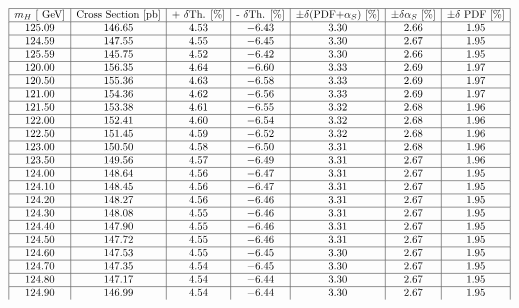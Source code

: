 \begin{table}[!h]
\begin{center}
\begin{equation}
\begin{array}{|c|c|c|c|c|c|c|}
 \hline
 m_H  \text{ [\ensuremath{~\text{GeV}}]}&\text{Cross Section [pb]}&\text{+ $\delta$Th. [\%]}&\text{- $\delta$Th. [\%]}&\pm\delta\text{(PDF+$\alpha_S$) [\%]}& \pm\delta\text{$\alpha_S$ [\%]} & \pm\delta\text{ PDF [\%]}  \\
\hline 
125.09 & 146.65 & 4.53 & -6.43 & 3.30 & 2.66 & 1.95\\
\hline 
124.59 & 147.55 & 4.55 & -6.45 & 3.30 & 2.67 & 1.95\\
\hline 
125.59 & 145.75 & 4.52 & -6.42 & 3.30 & 2.66 & 1.95\\
\hline 
120.00 & 156.35 & 4.64 & -6.60 & 3.33 & 2.69 & 1.97\\
\hline 
120.50 & 155.36 & 4.63 & -6.58 & 3.33 & 2.69 & 1.97\\
\hline 
121.00 & 154.36 & 4.62 & -6.56 & 3.33 & 2.69 & 1.97\\
\hline 
121.50 & 153.38 & 4.61 & -6.55 & 3.32 & 2.68 & 1.96\\
\hline 
122.00 & 152.41 & 4.60 & -6.54 & 3.32 & 2.68 & 1.96\\
\hline 
122.50 & 151.45 & 4.59 & -6.52 & 3.32 & 2.68 & 1.96\\
\hline 
123.00 & 150.50 & 4.58 & -6.50 & 3.31 & 2.68 & 1.96\\
\hline 
123.50 & 149.56 & 4.57 & -6.49 & 3.31 & 2.67 & 1.96\\
\hline 
124.00 & 148.64 & 4.56 & -6.47 & 3.31 & 2.67 & 1.95\\
\hline 
124.10 & 148.45 & 4.56 & -6.47 & 3.31 & 2.67 & 1.95\\
\hline 
124.20 & 148.27 & 4.56 & -6.46 & 3.31 & 2.67 & 1.95\\
\hline 
124.30 & 148.08 & 4.55 & -6.46 & 3.31 & 2.67 & 1.95\\
\hline 
124.40 & 147.90 & 4.55 & -6.46 & 3.31 & 2.67 & 1.95\\
\hline 
124.50 & 147.72 & 4.55 & -6.46 & 3.31 & 2.67 & 1.95\\
\hline 
124.60 & 147.53 & 4.55 & -6.45 & 3.30 & 2.67 & 1.95\\
\hline 
124.70 & 147.35 & 4.54 & -6.45 & 3.30 & 2.67 & 1.95\\
\hline 
124.80 & 147.17 & 4.54 & -6.44 & 3.30 & 2.67 & 1.95\\
\hline 
124.90 & 146.99 & 4.54 & -6.44 & 3.30 & 2.67 & 1.95\\

\end{array}
\end{equation}
\end{center}
\end{table}
